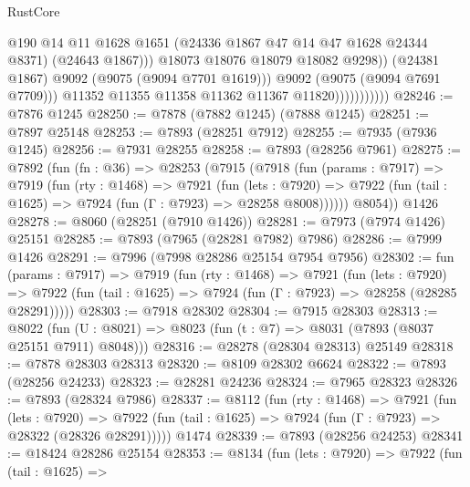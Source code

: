 \begin{lexlean}{RustCore}
\begin{coremodule}
                                      @190
                                      @14
                                      @11
                                      @1628
                                      @1651
                                      (@24336 @1867 @47 @14 @47 @1628 @24344 @8371)
                                      (@24643 @1867)))
                                  @18073
                                  @18076
                                  @18079
                                  @18082
                                  @9298))
                              (@24381 @1867)
                              @9092
                              (@9075 (@9094 @7701 @1619)))
                            @9092
                            (@9075 (@9094 @7691 @7709)))
                          @11352
                          @11355
                          @11358
                          @11362
                          @11367
                          @11820)))))))))))
@28246 := @7876 @1245
@28250 := @7878 (@7882 @1245) (@7888 @1245)
@28251 := @7897 @25148
@28253 := @7893 (@28251 @7912)
@28255 := @7935 (@7936 @1245)
@28256 := @7931 @28255
@28258 := @7893 (@28256 @7961)
@28275 := @7892
    (fun (fn : @36) =>
    @28253
      (@7915
        (@7918
          (fun (params : @7917) =>
          @7919
            (fun (rty : @1468) =>
            @7921
              (fun (lets : @7920) =>
              @7922 (fun (tail : @1625) => @7924 (fun (Γ : @7923) => @28258 @8008))))))
        @8054))
    @1426
@28278 := @8060 (@28251 (@7910 @1426))
@28281 := @7973 (@7974 @1426) @25151
@28285 := @7893 (@7965 (@28281 @7982) @7986)
@28286 := @7999 @1426
@28291 := @7996 (@7998 @28286 @25154 @7954 @7956)
@28302 := fun (params : @7917) =>
  @7919
    (fun (rty : @1468) =>
    @7921
      (fun (lets : @7920) =>
      @7922 (fun (tail : @1625) => @7924 (fun (Γ : @7923) => @28258 (@28285 @28291)))))
@28303 := @7918 @28302
@28304 := @7915 @28303
@28313 := @8022
    (fun (U : @8021) => @8023 (fun (t : @7) => @8031 (@7893 (@8037 @25151 @7911) @8048)))
@28316 := @28278 (@28304 @28313) @25149
@28318 := @7878 @28303 @28313
@28320 := @8109 @28302 @6624
@28322 := @7893 (@28256 @24233)
@28323 := @28281 @24236
@28324 := @7965 @28323
@28326 := @7893 (@28324 @7986)
@28337 := @8112
    (fun (rty : @1468) =>
    @7921
      (fun (lets : @7920) =>
      @7922 (fun (tail : @1625) => @7924 (fun (Γ : @7923) => @28322 (@28326 @28291)))))
    @1474
@28339 := @7893 (@28256 @24253)
@28341 := @18424 @28286 @25154
@28353 := @8134
    (fun (lets : @7920) =>
    @7922
      (fun (tail : @1625) =>

\end{coremodule}
\end{lexlean}
